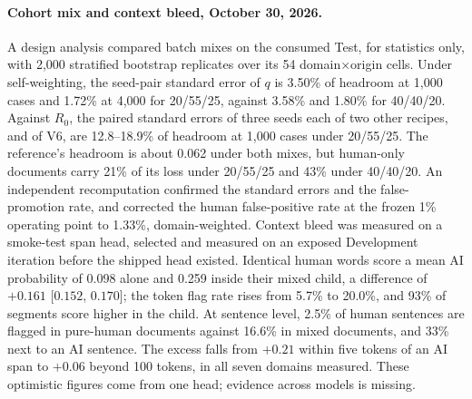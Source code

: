 \paragraph{Cohort mix and context bleed, October 30, 2026.}\label{cohort-mix-evidence}
A design analysis compared batch mixes on the consumed Test, for statistics
only, with 2,000 stratified bootstrap replicates over its 54
domain\(\times\)origin cells. Under self-weighting, the seed-pair standard error
of \(q\) is 3.50\% of headroom at 1,000 cases and 1.72\% at 4,000 for 20/55/25,
against 3.58\% and 1.80\% for 40/40/20. Against \(R_0\), the paired standard
errors of three seeds each of two other recipes, and of V6, are 12.8--18.9\% of
headroom at 1,000 cases under 20/55/25. The reference's headroom is about 0.062
under both mixes, but human-only documents carry 21\% of its loss under 20/55/25
and 43\% under 40/40/20. An independent recomputation confirmed the standard
errors and the false-promotion rate, and corrected the human false-positive rate
at the frozen 1\% operating point to 1.33\%, domain-weighted. Context bleed was
measured on a smoke-test span head, selected and measured on an exposed
Development iteration before the shipped head existed. Identical human words score a
mean AI probability of 0.098 alone and 0.259 inside their mixed child, a
difference of \(+0.161\) [\(0.152\), \(0.170\)]; the token flag rate rises from 5.7\%
to 20.0\%, and 93\% of segments score higher in the child. At sentence level,
2.5\% of human sentences are flagged in pure-human documents against 16.6\% in
mixed documents, and 33\% next to an AI sentence. The excess falls from
\(+0.21\) within five tokens of an AI span to \(+0.06\) beyond 100 tokens, in all
seven domains measured. These optimistic figures come from one head; evidence
across models is missing.

